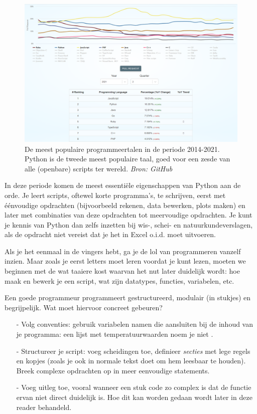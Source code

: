 \documentclass[a4paper,11pt, fleqn]{article}
\begin{document}
\begin{figure}[h]
	\includegraphics[width=16cm]{fig/github_languages.png}
	\caption{De meest populaire programmeertalen in de periode 2014-2021. Python is de tweede meest populaire taal, goed voor een zesde van alle (openbare) scripts ter wereld. \textit{Bron: GitHub}}
	\label{github-languages}
\end{figure}

In deze periode komen de meest essenti\"ele eigenschappen van Python aan de orde. Je leert scripts, oftewel korte programma's, te schrijven, eerst met \'e\'envoudige opdrachten (bijvoorbeeld rekenen, data bewerken, plots maken) en later met combinaties van deze opdrachten tot meervoudige opdrachten. Je kunt je kennis van Python dan zelfs inzetten bij wis-, schei- en natuurkundeverslagen, als de opdracht niet vereist dat je het in Excel o.i.d. moet uitvoeren.

Als je het eenmaal in de vingers hebt, ga je de lol van programmeren vanzelf inzien. Maar zoals je eerst letters moet leren voordat je kunt lezen, moeten we beginnen met de wat taaiere kost waarvan het nut later duidelijk wordt: hoe maak en bewerk je een script, wat zijn datatypes, functies, variabelen, etc.

Een goede programmeur programmeert gestructureerd, modulair (in stukjes) en begrijpelijk. Wat moet hiervoor concreet gebeuren?
\begin{itemize}
\item[-] Volg conventies: gebruik variabelen namen die aansluiten bij de inhoud van je programma: een lijst met temperatuurwaarden noem je niet .
\item[-] Structureer je script: voeg scheidingen toe, definieer \textit{secties} met lege regels en kopjes (zoals je ook in normale tekst doet om hem leesbaar te houden). Breek complexe opdrachten op in meer eenvoudige statements.
\item[-] Voeg uitleg toe, vooral wanneer een stuk code zo complex is dat de functie ervan niet direct duidelijk is. Hoe dit kan worden gedaan wordt later in deze reader behandeld.
\end{itemize}
\end{document}
